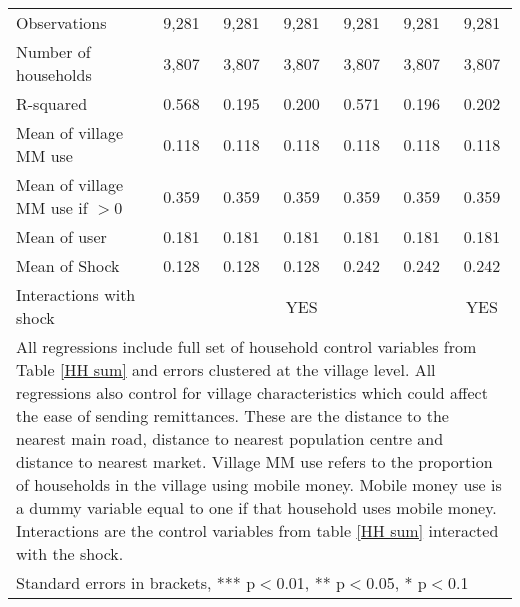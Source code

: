 \begin{table}
\begin{adjustwidth}{-1in}{-1in}
\begin{tabular}{lcccccc}
Observations & 9,281 & 9,281 & 9,281 & 9,281 & 9,281 & 9,281 \\
Number of households  & 3,807 & 3,807 & 3,807 & 3,807 & 3,807 & 3,807 \\
R-squared & 0.568 & 0.195 & 0.200 & 0.571 & 0.196 & 0.202 \\ \hline
Mean of village MM use  & 0.118 & 0.118 & 0.118 & 0.118 & 0.118 & 0.118 \\
Mean of village MM use if $>0$ & 0.359 & 0.359 & 0.359 & 0.359 & 0.359 & 0.359 \\
Mean of user & 0.181 & 0.181 & 0.181 & 0.181 & 0.181 & 0.181 \\
Mean of Shock & 0.128 & 0.128 & 0.128 & 0.242 & 0.242 & 0.242 \\
Interactions with shock &  &  & YES &  &  & YES \\ \hline
\multicolumn{7}{p{15cm}}{All regressions include full set of household control variables from Table \ref{HH sum} and errors clustered at the village level. All regressions also control for village characteristics which could affect the ease of sending remittances. These are the distance to the nearest main road, distance to nearest population centre and distance to nearest market. Village MM use refers to the proportion of households in the village using mobile money. Mobile money use is a dummy variable equal to one if that household uses mobile money. Interactions are the control variables from table \ref{HH sum} interacted with the shock.} \\
\multicolumn{7}{l}{ Standard errors in brackets, *** p$<$0.01, ** p$<$0.05, * p$<$0.1} 
\end{tabular}
 \end{adjustwidth}
 \end{table}
 
